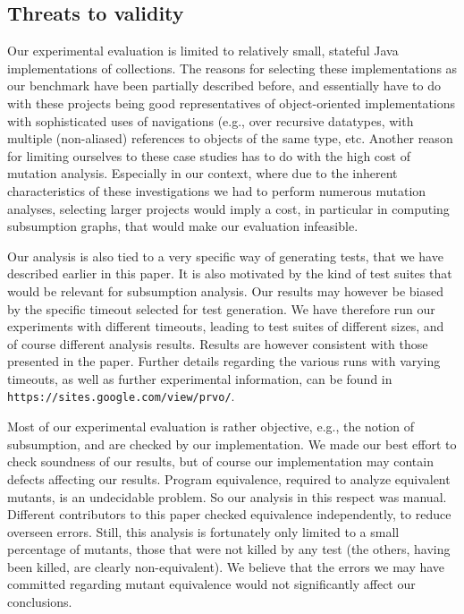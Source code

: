 \subsection{Threats to validity}

Our experimental evaluation is limited to relatively small, stateful Java implementations of collections. The reasons for selecting these implementations as our benchmark have been partially described before, and essentially have to do with these projects being good representatives of object-oriented implementations with sophisticated uses of navigations (e.g., over recursive datatypes, with multiple (non-aliased) references to objects of the same type, etc. Another reason for limiting ourselves to these case studies has to do with the high cost of mutation analysis. Especially in our context, where due to the inherent characteristics of these investigations we had to perform numerous mutation analyses, selecting larger projects would imply a cost, in particular in computing subsumption graphs, that would make our evaluation infeasible. 

Our analysis is also tied to a very specific way of generating tests, that we have described earlier in this paper. It is also motivated by the kind of test suites that would be relevant for subsumption analysis. Our results may however be biased by the specific timeout selected for test generation. We have therefore run our experiments with different timeouts, leading to test suites of different sizes, and of course different analysis results. Results are however consistent with those presented in the paper. Further details regarding the various runs with varying timeouts, as well as further experimental information, can be found in \texttt{https://sites.google.com/view/prvo/}. 

Most of our experimental evaluation is rather objective, e.g., the notion of subsumption, and are checked by our implementation. We made our best effort to check soundness of our results, but of course our implementation may contain defects affecting our results. Program equivalence, required to analyze equivalent mutants, is an undecidable problem. So our analysis in this respect was manual. Different contributors to this paper checked equivalence independently, to reduce overseen errors. Still, this analysis is fortunately only limited to a small percentage of mutants, those that were not killed by any test (the others, having been killed, are clearly non-equivalent). We believe that the errors we may have committed regarding mutant equivalence would not significantly affect our conclusions. 

